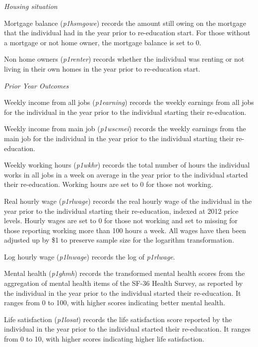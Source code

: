 \documentclass[12pt, a4paper]{article}
\begin{document}
\emph{Housing situation}

Mortgage balance (\textit{p1\textunderscore{}hsmgowe}) records the amount still owing on the mortgage that the individual had in the year prior to re-education start. For those without a mortgage or not home owner, the mortgage balance is set to 0. 

Non home owners (\textit{p1\textunderscore{}renter}) records whether the individual was renting or not living in their own homes in the year prior to re-education start.


\emph{Prior Year Outcomes}

Weekly income from all jobs (\textit{p1\textunderscore{}earning}) records the weekly earnings from all jobs for the individual in the year prior to the individual starting their re-education. 

Weekly income from main job (\textit{p1\textunderscore{}wscmei}) records the weekly earnings from the main job for the individual in the year prior to the individual starting their re-education.
 
Weekly working hours (\textit{p1\textunderscore{}wkhr}) records the total number of hours the individual works in all jobs in a week on average in the year prior to the individual started their re-education. Working hours are set to 0 for those not working. 

Real hourly wage (\textit{p1\textunderscore{}rlwage}) records the real hourly wage of the individual in the year prior to the individual starting their re-education, indexed at 2012 price levels. Hourly wages are set to 0 for those not working and set to missing for those reporting working more than 100 hours a week. All wages have then been adjusted up by \$1 to preserve sample size for the logarithm transformation. 

Log hourly wage (\textit{p1\textunderscore{}lnwage}) records the log of  \textit{p1\textunderscore{}rlwage}. 

Mental health (\textit{p1\textunderscore{}ghmh}) records the transformed mental health scores from the aggregation of mental health items of the SF-36 Health Survey, as reported by the individual in the year prior to the individual started their re-education. It ranges from 0 to 100, with higher scores indicating better mental health.   

Life satisfaction (\textit{p1\textunderscore{}losat}) records the life satisfaction score reported by the individual in the year prior to the individual started their re-education. It ranges from 0 to 10, with higher scores indicating higher life satisfaction. 
\end{document}
